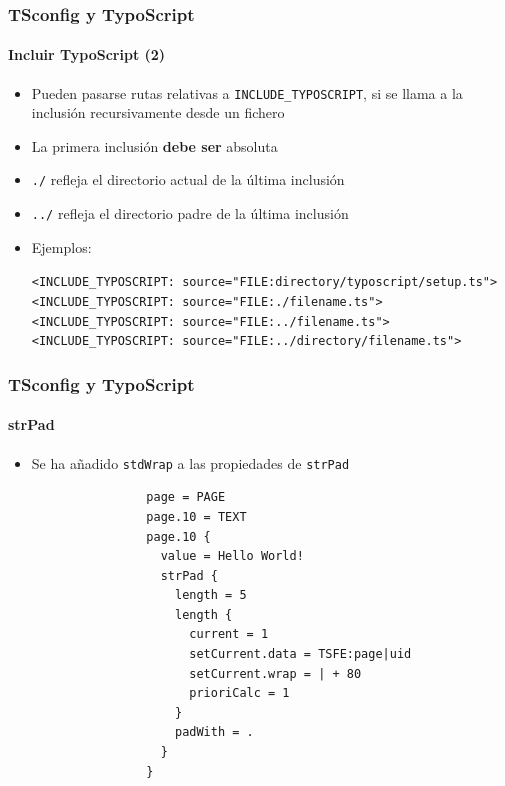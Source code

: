 
\begin{frame}[fragile]
	\frametitle{TSconfig y TypoScript}
	\framesubtitle{Incluir TypoScript (2)}

	\begin{itemize}
		\item Pueden pasarse rutas relativas a \texttt{INCLUDE\_TYPOSCRIPT},\newline
			si se llama a la inclusión recursivamente desde un fichero
		\item La primera inclusión \textbf{debe ser} absoluta
		\item \texttt{./} refleja el directorio actual de la última inclusión
		\item \texttt{../} refleja el directorio padre de la última inclusión
		\item Ejemplos:

			\lstinline!<INCLUDE_TYPOSCRIPT: source="FILE:directory/typoscript/setup.ts">!
			\lstinline!<INCLUDE_TYPOSCRIPT: source="FILE:./filename.ts">!
			\lstinline!<INCLUDE_TYPOSCRIPT: source="FILE:../filename.ts">!
			\lstinline!<INCLUDE_TYPOSCRIPT: source="FILE:../directory/filename.ts">!

	\end{itemize}

\end{frame}


\begin{frame}[fragile]
	\frametitle{TSconfig y TypoScript}
	\framesubtitle{strPad}

	\begin{itemize}
		\item Se ha añadido \texttt{stdWrap} a las propiedades de \texttt{strPad}

			\begin{lstlisting}
				page = PAGE
				page.10 = TEXT
				page.10 {
				  value = Hello World!
				  strPad {
				    length = 5
				    length {
				      current = 1
				      setCurrent.data = TSFE:page|uid
				      setCurrent.wrap = | + 80
				      prioriCalc = 1
				    }
				    padWith = .
				  }
				}
			\end{lstlisting}

	\end{itemize}

\end{frame}

